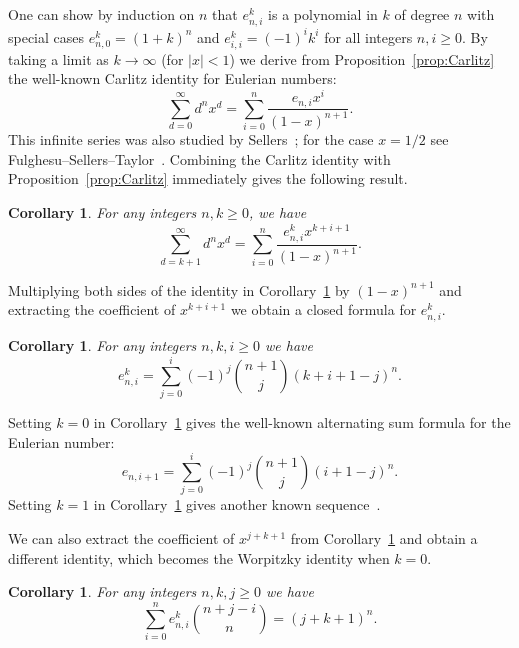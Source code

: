 \documentclass[10pt]{amsart}
\newtheorem{corollary}[theorem]{Corollary}
\theoremstyle{definition}
\theoremstyle{remark}
\begin{document}
One can show by induction on $n$ that $e_{n,i}^k$ is a polynomial in $k$ of degree $n$ with special cases $e_{n,0}^k = (1+k)^n$ and $e_{i,i}^k = (-1)^i k^i$ for all integers $n,i\ge0$.
By taking a limit as $k\to\infty$ (for $|x|<1$) we derive from Proposition~\ref{prop:Carlitz} the well-known Carlitz identity for Eulerian numbers:
\[ \sum_{d=0}^\infty d^n x^d = \sum_{i=0}^n \frac{e_{n,i} x^i}{(1-x)^{n+1}}. \]
This infinite series was also studied by Sellers~\cite{Sellers}; for the case $x=1/2$ see Fulghesu--Sellers--Taylor~\cite{FulghesuSellersTaylor}.
Combining the Carlitz identity with Proposition~\ref{prop:Carlitz} immediately gives the following result.

\begin{corollary}\label{cor:sum}
For any integers $n,k\ge0$, we have
\[ \sum_{d=k+1}^\infty d^n x^d = \sum_{i=0}^n \frac{e_{n,i}^k x^{k+i+1}}{(1-x)^{n+1}}.
\]
\end{corollary}

Multiplying both sides of the identity in Corollary~\ref{cor:sum} by $(1-x)^{n+1}$ and extracting the coefficient of $x^{k+i+1}$ we obtain a closed formula for $e_{n,i}^k$.

\begin{corollary}\label{cor:ek}
For any integers $n,k,i\ge0$ we have
\[
e_{n,i}^k = \sum_{j=0}^{i} (-1)^j \binom{n+1}{j} (k+i+1-j)^n.
\]
\end{corollary}

Setting $k=0$ in Corollary~\ref{cor:sum} gives the well-known alternating sum formula for the Eulerian number:
\[
e_{n,i+1} = \sum_{j=0}^{i} (-1)^j \binom{n+1}{j} (i+1-j)^n.
\]
Setting $k=1$ in Corollary~\ref{cor:sum} gives another known sequence~\cite[A180246]{OEIS}.

We can also extract the coefficient of $x^{j+k+1}$ from Corollary~\ref{cor:sum} and obtain a different identity, which becomes the Worpitzky identity when $k=0$.

\begin{corollary}\label{cor:Worpitzky}
For any integers $n,k,j\ge0$ we have
\[
\sum_{i=0}^n e_{n,i}^k \binom{n+j-i}{n} = (j+k+1)^n .
\]
\end{corollary}
\end{document}
